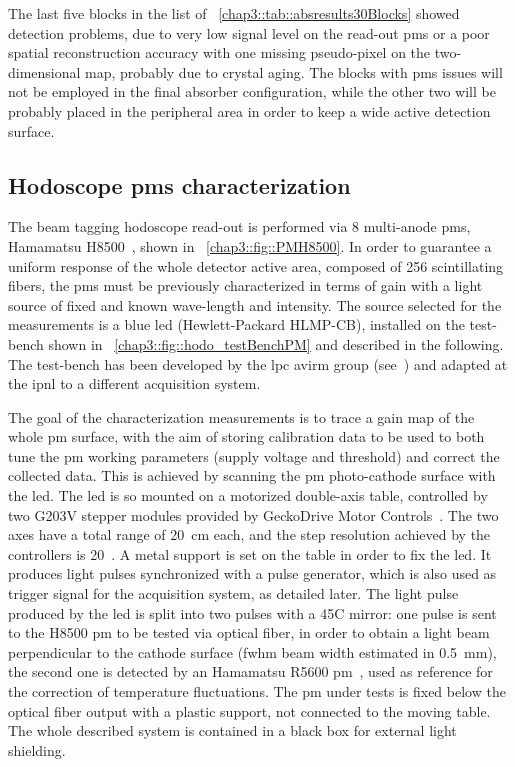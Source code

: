 The last five blocks in the list of \tablename~\ref{chap3::tab::absresults30Blocks} showed detection problems, due to very low signal level on the read-out \glspl{pm} or a poor spatial reconstruction accuracy with one missing pseudo-pixel on the two-dimensional map, probably due to crystal aging. The blocks with \glspl{pm} issues will not be employed in the final absorber configuration, while the other two will be probably placed in the peripheral area in order to keep a wide active detection surface.   


\subsection{Hodoscope \glspl{pm} characterization}\label{chap3::subsec::hodoPMchar}         

The beam tagging hodoscope read-out is performed via 8 multi-anode \glspl{pm}, Hamamatsu H8500~\parencite{Hamamatsu2006}, shown in \figurename~\ref{chap3::fig::PMH8500}. In order to guarantee a uniform response of the whole detector active area, composed of 256 scintillating fibers, the \glspl{pm} must be previously characterized in terms of gain with a light source of fixed and known wave-length and intensity. The source selected for the measurements is a blue \gls{led} (Hewlett-Packard HLMP-CB), installed on the test-bench shown in \figurename~\ref{chap3::fig::hodo_testBenchPM} and described in the following. The test-bench has been developed by the \gls{lpc} \gls{avirm} group (see~\cite{Gaglione2013}) and adapted at the \gls{ipnl} to a different acquisition system.

The goal of the characterization measurements is to trace a gain map of the whole \gls{pm} surface, with the aim of storing calibration data to be used to both tune the \gls{pm} working parameters (supply voltage and threshold) and correct the collected data. This is achieved by scanning the \gls{pm} photo-cathode surface with the \gls{led}. The \gls{led} is so mounted on a motorized double-axis table, controlled by two G203V stepper modules provided by GeckoDrive Motor Controls~\parencite{GeckoDrive2010}. The two axes have a total range of 20~cm each, and the step resolution achieved by the controllers is 20~\charmum. A metal support is set on the table in order to fix the \gls{led}. It produces light pulses synchronized with a pulse generator, which is also used as trigger signal for the acquisition system, as detailed later. The light pulse produced by the \gls{led} is split into two pulses with a 45\textdegree{}C mirror: one pulse is sent to the H8500 \gls{pm} to be tested via optical fiber, in order to obtain a light beam perpendicular to the cathode surface (\gls{fwhm} beam width estimated in 0.5~mm), the second one is detected by an Hamamatsu R5600 \gls{pm}~\parencite{Hamamatsu1995}, used as reference for the correction of temperature fluctuations. The \gls{pm} under tests is fixed below the optical fiber output with a plastic support, not connected to the moving table. The whole described system is contained in a black box for external light shielding.

